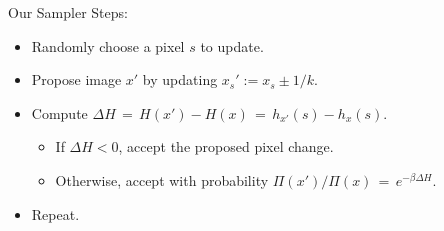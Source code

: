 \documentclass[10pt]{beamer}
\begin{document}
\begin{frame}{Our Sampler}
Steps:
\begin{itemize}
\item Randomly choose a pixel $s$ to update.
\item Propose image $x'$ by updating $x_s' := x_s \pm 1/k$.
\item Compute $\Delta\!H \,=\, H(x') - H(x) \,=\, h_{x'}(s) - h_x(s)$.
\begin{itemize}
\item If $\Delta\!H < 0$, accept the proposed pixel change.
\item Otherwise, accept with probability $\Pi(x')/\Pi(x) \,=\, e^{-\beta\Delta\!H}$.
\end{itemize}
\item Repeat.
\end{itemize}
\end{frame}






\end{document}
